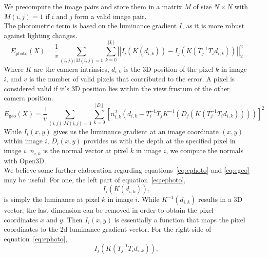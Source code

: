         We precompute the image pairs and store them in a matrix $M$ of size $N \times N$ with $M(i,j) = 1$ if $i$ and $j$ form a valid image pair.\\
        The photometric term is based on the luminance gradient $I$, as it is more robust against lighting changes.
        \begin{equation}
            E_{\text{photo}}(X) =
            \frac{1}{v} \sum_{(i,j) | M(i,j)=1}\sum_{k=0}^{\left\lvert I_i \right\rvert}
            \left\lvert\left\lvert
            I_i(K(d_{i,k})) - I_j(K(T_j^{-1}T_id_{i,k}))
            \right\rvert\right\rvert_2^2
            \label{eq:ephoto}
        \end{equation}
        Where $K$ are the camera intrinsics, $d_{i,k}$ is the 3D position of the pixel $k$ in image $i$, and $v$ is the number of valid pixels that contributed to the error.
        A pixel is considered valid if it's 3D position lies within the view frustum of the other camera position.
        \begin{equation}
            E_{\text{geo}}(X) =
            \frac{1}{v} \sum_{(i,j) | M(i,j)=1}\sum_{k=0}^{\left\lvert D_i \right\rvert}
            \left[
            n_{i,k}^T \left(d_{i,k} - T_i^{-1}T_jK^{-1} \left( D_j \left( K\left( T_j^{-1}T_id_{i,k} \right) \right) \right)\right)
            \right]^2
            \label{eq:egeo}
        \end{equation}
        While $I_i(x,y)$ gives us the luminance gradient at an image coordinate $(x,y)$ within image $i$, $D_i(x,y)$ provides us with the depth at the specified pixel in image $i$.
        $n_{i,k}$ is the normal vector at pixel $k$ in image $i$, we compute the normals with Open3D.\\
        We believe some further elaboration regarding equations~\ref{eq:ephoto} and \ref{eq:egeo} may be useful.
        For one, the left part of equation~\ref{eq:ephoto},
        \begin{equation*}
            I_i(K(d_{i,k})),
        \end{equation*}
        is simply the luminance at pixel $k$ in image $i$.
        While $K^{-1}(d_{i,k})$ results in a 3D vector, the last dimension can be removed in order to obtain the pixel coordinates $x$ and $y$.
        Then $I_i(x,y)$ is essentially a function that maps the pixel coordinates to the 2d luminance gradient vector.
        For the right side of equation~\ref{eq:ephoto},
        \begin{equation*}
            I_j(K(T_j^{-1}T_id_{i,k})),
        \end{equation*}
